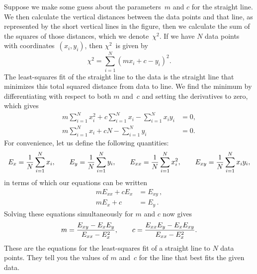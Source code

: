 \documentclass[12pt]{article}
\begin{document}
\begin{exercises}
Suppose we make some guess about the parameters~$m$ and $c$ for the
straight line.  We then calculate the vertical distances between the data
points and that line, as represented by the short vertical lines in the
figure, then we calculate the sum of the squares of those distances, which
we denote~$\chi^2$.  If we have $N$ data points with
coordinates~$(x_i,y_i)$, then $\chi^2$~is given by
\begin{displaymath}
\chi^2 = \sum_{i=1}^N (mx_i+c-y_i)^2.
\end{displaymath}
The least-squares fit of the straight line to the data is the straight line
that minimizes this total squared distance from data to line.  We find the
minimum by differentiating with respect to both $m$ and~$c$ and setting the
derivatives to zero, which gives
\begin{align*}
m \sum_{i=1}^N x_i^2 + c \sum_{i=1}^N x_i - \sum_{i=1}^N x_iy_i &= 0, \\
m \sum_{i=1}^N x_i + cN - \sum_{i=1}^N y_i &= 0.
\end{align*}
For convenience, let us define the following quantities:
\begin{displaymath}
E_x = {1\over N} \sum_{i=1}^N x_i,\qquad
E_y = {1\over N} \sum_{i=1}^N y_i,\qquad
E_{xx} = {1\over N} \sum_{i=1}^N x_i^2,\qquad
E_{xy} = {1\over N} \sum_{i=1}^N x_iy_i,
\end{displaymath}
in terms of which our equations can be written
\begin{align*}
mE_{xx} + cE_x &= E_{xy}\,, \\
mE_x + c &= E_y\,.
\end{align*}
Solving these equations simultaneously for $m$ and $c$ now gives
\begin{displaymath}
m = {E_{xy}-E_x E_y\over E_{xx} - E_x^2},\qquad
c = {E_{xx}E_y-E_x E_{xy}\over E_{xx} - E_x^2}.
\end{displaymath}
These are the equations for the least-squares fit of a straight line to $N$
data points.  They tell you the values of $m$ and~$c$ for the line that
best fits the given data.


\end{exercises}
\end{document}
